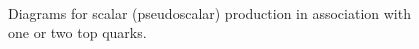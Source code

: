 \begin{figure}[htbp!]
    \centering
     \\
\caption{Diagrams for scalar (pseudoscalar) production in association with 
one or two top quarks.}
\label{fig:thdm_diagrams}
\end{figure}

\FloatBarrier

